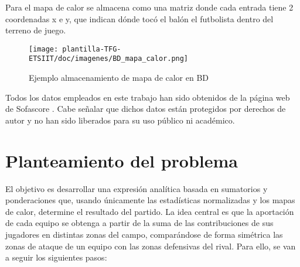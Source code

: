 Para el mapa de calor se almacena como una matriz donde cada entrada tiene 2 coordenadas x e y,  que indican dónde tocó el balón el futbolista dentro del terreno de juego.

\begin{figure}[H]
    \centering
    \texttt{[image: plantilla-TFG-ETSIIT/doc/imagenes/BD\_mapa\_calor.png]}
    \caption{Ejemplo almacenamiento de mapa de calor en BD}
    \label{fig:etiqueta-imagen}
\end{figure}

Todos los datos empleados en este trabajo han sido obtenidos de la página web de Sofascore \cite{Sofascore}. Cabe señalar que dichos datos están protegidos por derechos de autor y no han sido liberados para su uso público ni académico.

\section{Planteamiento del problema}
El objetivo es desarrollar una expresión analítica basada en sumatorios y ponderaciones que, usando únicamente las estadísticas normalizadas y los mapas de calor, determine el resultado del partido. La idea central es que la aportación de cada equipo se obtenga a partir de la suma de las contribuciones de sus jugadores en distintas zonas del campo, comparándose de forma simétrica las zonas de ataque de un equipo con las zonas defensivas del rival. Para ello, se van a seguir los siguientes pasos:

